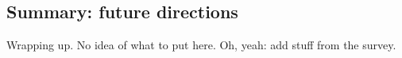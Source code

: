 \documentclass[9pt,twocolumn,twoside,lineno]{pnas-new}
\begin{document}
\subsection*{Summary: future directions}

Wrapping up. No idea of what to put here. Oh, yeah: add stuff from the survey.



\end{document}
